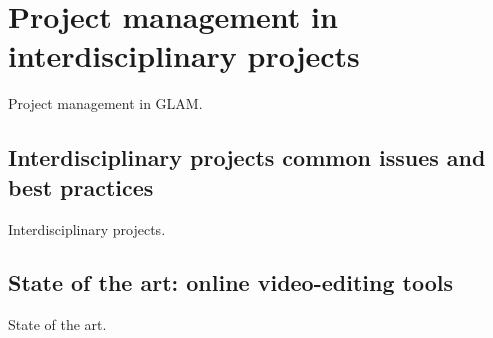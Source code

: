 \chapter{Project management in interdisciplinary projects}
\label{ch:ch2_ProjectManagement}


Project management in GLAM.

\section{Interdisciplinary projects common issues and best practices}

Interdisciplinary projects.

\section{State of the art: online video-editing tools}

State of the art.